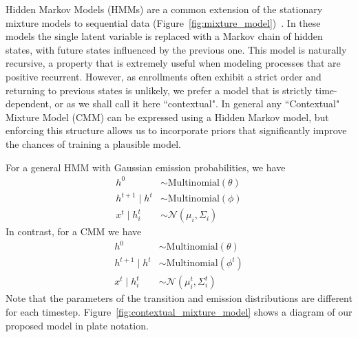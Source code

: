 \documentclass{edm_template}
\begin{document}
Hidden Markov Models (HMMs) are a common extension of the stationary mixture models to sequential data (Figure~\ref{fig:mixture_model})~\cite{rabiner1989tutorial}. In these models the single latent variable is replaced with a Markov chain of hidden states, with future states influenced by the previous one. This model is naturally recursive, a property that is extremely useful when modeling processes that are positive recurrent. However, as enrollments often exhibit a strict order and returning to previous states is unlikely, we prefer a model that is strictly time-dependent, or as we shall call it here ``contextual". In general any ``Contextual" Mixture Model (CMM) can be expressed using a Hidden Markov model, but enforcing this structure allows us to incorporate priors that significantly improve the chances of training a plausible model.

For a general HMM with Gaussian emission probabilities, we have 
\begin{align*}
h^0 &\sim \text{Multinomial}(\theta) \\    
h^{t+1} \mid h^{t} &\sim \text{Multinomial}(\phi) \\
x^{t} \mid h_i^{t} &\sim \mathcal{N}(\mu_i, \Sigma_i)
\end{align*}
In contrast, for a CMM we have 
\begin{align*}
h^0 &\sim \text{Multinomial}(\theta) \\    
h^{t+1} \mid h^{t} &\sim \text{Multinomial}(\phi^t) \\
x^{t} \mid h_i^{t} &\sim \mathcal{N}(\mu^t_i, \Sigma^t_i)
\end{align*}
Note that the parameters of the transition and emission distributions are different for each timestep. Figure~\ref{fig:contextual_mixture_model} shows a diagram of our proposed model in plate notation.
\end{document}
